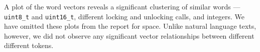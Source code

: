 A plot of the word vectors reveals a significant clustering of similar
words --- {\texttt {uint8\_t}} and {\texttt {uint16\_t}}, different locking and
unlocking calls, and integers. We have omitted these plots from the report for
space. Unlike natural language texts, however,
we did not observe any significant vector relationships between different
different tokens.
